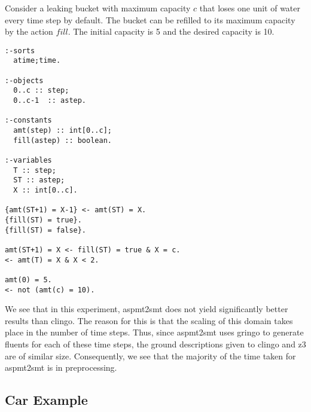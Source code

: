 \documentclass[runningheads]{llncs}
\begin{document}
Consider a leaking bucket with maximum capacity $c$ that loses one
unit of water every time step by default. The bucket can be refilled
to its maximum capacity by the action $fill$. The initial capacity is
5 and the desired capacity is 10.
\BOCC
\begin{lstlisting}
:-sorts
  atime;time.

:-objects
  0..c :: step;
  0..c-1  :: astep.

:-constants
  amt(step) :: int[0..c];
  fill(astep) :: boolean.

:-variables
  T :: step;
  ST :: astep;
  X :: int[0..c].

{amt(ST+1) = X-1} <- amt(ST) = X.
{fill(ST) = true}.
{fill(ST) = false}.

amt(ST+1) = X <- fill(ST) = true & X = c.
<- amt(T) = X & X < 2.

amt(0) = 5.
<- not (amt(c) = 10).
\end{lstlisting}
\EOCC


We see that in this experiment, {\sc aspmt2smt} does not yield
significantly better results than {\sc clingo}. The reason for this
is that the scaling of this domain takes place in the number of time steps. Thus, since {\sc aspmt2smt} uses {\sc gringo} to generate fluents 
for each of these time steps, the ground descriptions given to {\sc clingo} and {\sc z3} are of similar size. Consequently, we see that the majority
of the time taken for {\sc aspmt2smt} is in preprocessing.

\subsection{Car Example}
\end{document}
